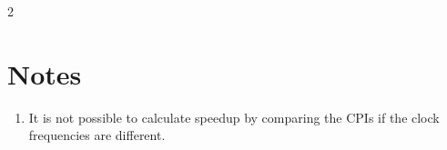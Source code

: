\documentclass[a4paper,12pt]{article}
\begin{document}
\begin{multicols*}{2}
  \section{Notes}
  {\large\begin{enumerate}
    \item It is not possible to calculate speedup by comparing the CPIs if the
      clock frequencies are different.
  \end{enumerate}}
\end{multicols*}
\end{document}
